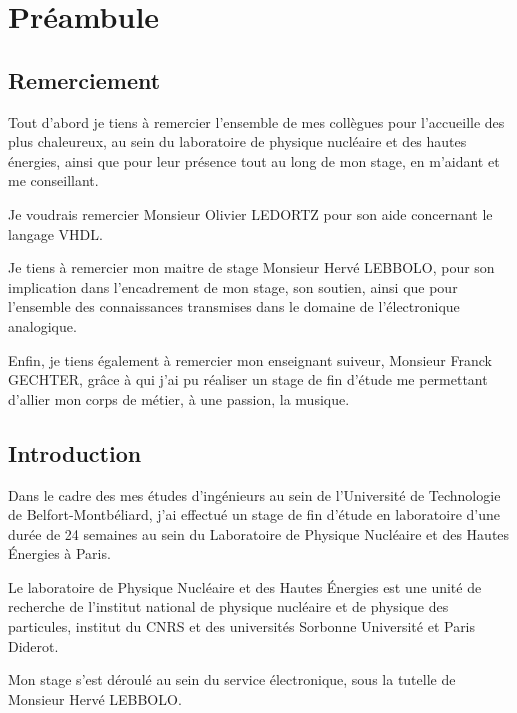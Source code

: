 \documentclass[french,a4paper,12pt]{report}
\begin{document}
\makeatother

\tableofcontents

\part{Préambule}

  \chapter{Remerciement}
  Tout d'abord je tiens à remercier l'ensemble de mes collègues pour l'accueille des plus chaleureux, au sein du laboratoire de physique nucléaire et des hautes énergies, ainsi que pour leur présence tout au long de mon stage, en m'aidant et me conseillant.\newline
  
  Je voudrais remercier Monsieur Olivier LEDORTZ pour son aide concernant le langage VHDL.\newline
  
  Je tiens à remercier mon maitre de stage Monsieur Hervé LEBBOLO, pour son implication dans l'encadrement de mon stage, son soutien, ainsi que pour l'ensemble des connaissances transmises dans le domaine de l'électronique analogique.\newline
  
  Enfin, je tiens également à remercier mon enseignant suiveur, Monsieur Franck GECHTER, grâce à qui j'ai pu réaliser un stage de fin d'étude me permettant d'allier mon corps de métier, à une passion, la musique.
  
 \chapter{Introduction}

Dans le cadre des mes études d'ingénieurs au sein de l'Université de Technologie de Belfort-Montbéliard, j'ai effectué un stage de fin d'étude en laboratoire d'une durée de 24 semaines au sein du Laboratoire de Physique Nucléaire et des Hautes Énergies à Paris.\newline

Le laboratoire de Physique Nucléaire et des Hautes Énergies est une unité de recherche de l'institut national de  physique nucléaire et de physique des particules, institut du CNRS et des universités Sorbonne Université et Paris Diderot.\newline

Mon stage s'est déroulé au sein du service électronique, sous la tutelle de Monsieur Hervé LEBBOLO.\newline
\end{document}

